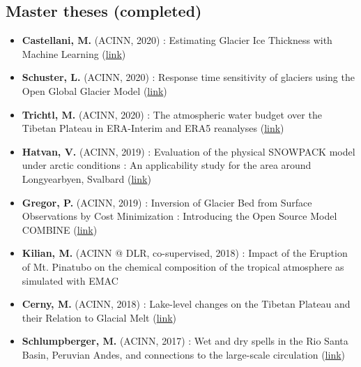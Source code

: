 \subsection*{Master theses (completed)}
\label{\detokenize{ch08/cv:master-theses-completed}}\begin{itemize}[nosep]
\item {} 
\textbf{Castellani, M.} (ACINN, 2020)
: Estimating Glacier Ice Thickness with Machine Learning (\href{https://diglib.uibk.ac.at/urn:nbn:at:at-ubi:1-60115}{link})

\item {} 
\textbf{Schuster, L.} (ACINN, 2020)
: Response time sensitivity of glaciers using the Open Global Glacier Model (\href{https://diglib.uibk.ac.at/ulbtirolhs/content/titleinfo/4864453}{link})

\item {} 
\textbf{Trichtl, M.} (ACINN, 2020)
: The atmospheric water budget over the Tibetan Plateau in ERA-Interim and ERA5 reanalyses (\href{https://diglib.uibk.ac.at/ulbtirolhs/content/titleinfo/4888002}{link})

\item {} 
\textbf{Hatvan, V.} (ACINN, 2019)
: Evaluation of the physical SNOWPACK model under arctic conditions : An applicability study for the area around Longyearbyen, Svalbard (\href{http://diglib.uibk.ac.at/ulbtirolhs/content/titleinfo/3584652}{link})

\item {} 
\textbf{Gregor, P.} (ACINN, 2019)
: Inversion of Glacier Bed from Surface Observations by Cost Minimization : Introducing the Open Source Model COMBINE (\href{http://diglib.uibk.ac.at/ulbtirolhs/content/titleinfo/3086935}{link})

\item {} 
\textbf{Kilian, M.} (ACINN @ DLR, co-supervised, 2018)
: Impact of the Eruption of Mt. Pinatubo on the chemical composition of the tropical atmosphere as simulated with EMAC

\item {} 
\textbf{Cerny, M.} (ACINN, 2018)
: Lake-level changes on the Tibetan Plateau and their Relation to Glacial Melt (\href{http://diglib.uibk.ac.at/ulbtirolhs/content/titleinfo/2347464}{link})

\item {} 
\textbf{Schlumpberger, M.} (ACINN, 2017)
: Wet and dry spells in the Rio Santa Basin, Peruvian Andes, and connections to the large-scale circulation (\href{http://diglib.uibk.ac.at/urn:nbn:at:at-ubi:1-6985}{link})


\end{itemize}
